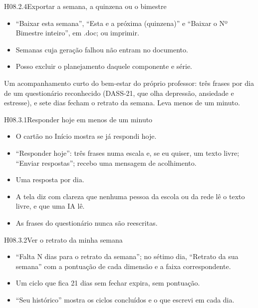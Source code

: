 \begin{historia}{H08.2.4}{Exportar a semana, a quinzena ou o bimestre}{\pronto}
\aceite
\begin{itemize}
  \item \enquote{Baixar esta semana}, \enquote{Esta e a próxima (quinzena)} e
    \enquote{Baixar o Nº Bimestre inteiro}, em .doc; ou imprimir.
  \item Semanas cuja geração falhou não entram no documento.
  \item Posso excluir o planejamento daquele componente e série.
\end{itemize}
\end{historia}


Um acompanhamento curto do bem-estar do próprio professor: três frases por dia
de um questionário reconhecido (DASS-21, que olha depressão, ansiedade e
estresse), e sete dias fecham o retrato da semana. Leva menos de um minuto.

\begin{historia}{H08.3.1}{Responder hoje em menos de um minuto}{\pronto}
\aceite
\begin{itemize}
  \item O cartão no Início mostra se já respondi hoje.
  \item \enquote{Responder hoje}: três frases numa escala e, se eu quiser, um
    texto livre; \enquote{Enviar respostas}; recebo uma mensagem de
    acolhimento.
  \item Uma resposta por dia.
  \item A tela diz com clareza que nenhuma pessoa da escola ou da rede lê o
    texto livre, e que uma IA lê.
  \item As frases do questionário nunca são reescritas.
\end{itemize}
\end{historia}

\begin{historia}{H08.3.2}{Ver o retrato da minha semana}{\pronto}
\aceite
\begin{itemize}
  \item \enquote{Falta N dias para o retrato da semana}; no sétimo dia,
    \enquote{Retrato da sua semana} com a pontuação de cada dimensão e a faixa
    correspondente.
  \item Um ciclo que fica 21 dias sem fechar expira, sem pontuação.
  \item \enquote{Seu histórico} mostra os ciclos concluídos e o que escrevi em
    cada dia.
\end{itemize}
\end{historia}

